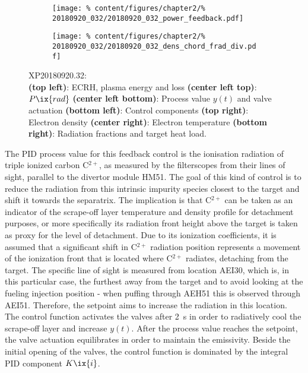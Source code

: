                 \begin{figure}[t]%
                    \centering%
                    \begin{subfigure}{.48\textwidth}%
                        \centering%
                        \texttt{[image: \%
                            content/figures/chapter2/\%
                            20180920\_032/20180920\_032\_power\_feedback.pdf]}%
                    \end{subfigure}%
                    \hfill%
                    \begin{subfigure}{.48\textwidth}%
                        \centering%
                        \texttt{[image: \%
                            content/figures/chapter2/\%
                            20180920\_032/20180920\_032\_dens\_chord\_frad\_div.pdf]}%
                    \end{subfigure}%
                    \caption{%
                        XP20180920.32:\\%
                        \textbf{(top left)}: ECRH, plasma energy and loss \textbf{(center left top)}: $P\ix{rad}$ \textbf{(center left bottom)}: Process value $y\left(t\right)$ and valve actuation \textbf{(bottom left)}: Control components \textbf{(top right)}: Electron density \textbf{(center right)}: Electron temperature \textbf{(bottom right)}: Radiation fractions and target heat load.}\label{fig:20180920.32_PDF}%
                \end{figure}%
%
                The PID process value for this feedback control is the ionisation radiation of triple ionized carbon C$^{2+}$, as measured by the filterscopes from their lines of sight, parallel to the divertor module HM51. The goal of this kind of control is to reduce the radiation from this intrinsic impurity species closest to the target and shift it towards the separatrix. The implication is that C$^{2+}$ can be taken as an indicator of the scrape-off layer temperature and density profile for detachment purposes, or more specifically its radiation front height above the target is taken as proxy for the level of detachment. Due to its ionization coefficients, it is assumed that a significant shift in C$^{2+}$ radiation position represents a movement of the ionization front that is located where C$^{2+}$ radiates, detaching from the target. The specific line of sight is measured from location AEI30, which is, in this particular case, the furthest away from the target and to avoid looking at the fueling injection position - when puffing through AEH51 this is observed through AEI51. Therefore, the setpoint aims to increase the radiation in this location. The control function activates the valves after \SI{2}{\second} in order to radiatively cool the scrape-off layer and increase $y\left(t\right)$. After the process value reaches the setpoint, the valve actuation equilibrates in order to maintain the emissivity. Beside the initial opening of the valves, the control function is dominated by the integral PID component $K\ix{i}$.\\%

